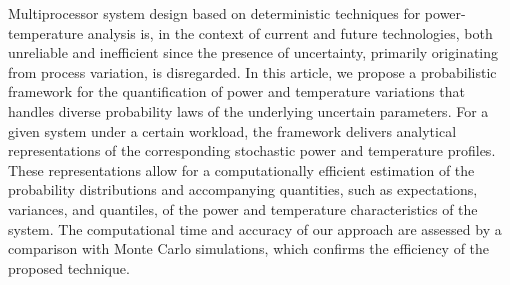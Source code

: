 Multiprocessor system design based on deterministic techniques for power-temperature analysis is, in the context of current and future technologies, both unreliable and inefficient since the presence of uncertainty, primarily originating from process variation, is disregarded.
In this article, we propose a probabilistic framework for the quantification of power and temperature variations that handles diverse probability laws of the underlying uncertain parameters.
For a given system under a certain workload, the framework delivers analytical representations of the corresponding stochastic power and temperature profiles.
These representations allow for a computationally efficient estimation of the probability distributions and accompanying quantities, such as expectations, variances, and quantiles, of the power and temperature characteristics of the system.
The computational time and accuracy of our approach are assessed by a comparison with Monte Carlo simulations, which confirms the efficiency of the proposed technique.
